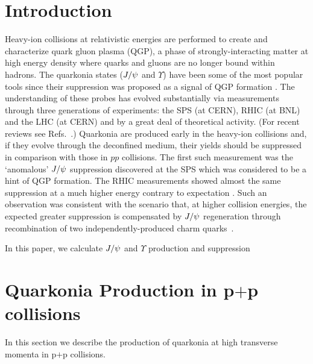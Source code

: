 \documentclass[aps,prc,preprint,superscriptaddress,showpacs,showkeys,amsmath]{revtex4-1}
\begin{document}
\maketitle

\section{Introduction}
Heavy-ion collisions at relativistic energies are performed to create and characterize 
quark gluon plasma (QGP), a phase of strongly-interacting matter at high energy density 
where quarks and gluons are no longer bound within hadrons.
The quarkonia states ($J/\psi$ and $\Upsilon$) have been some of the most popular tools 
since their suppression was proposed as a signal of QGP formation \cite{Matsui:1986dk}.
The understanding of these probes has evolved substantially via measurements 
through three generations of experiments: the SPS (at CERN), RHIC (at BNL) and the LHC (at CERN) 
and by a great deal of theoretical activity. (For recent reviews see 
Refs.~\cite{Schukraft:2013wba,Kluberg:2009wc,Brambilla:2010cs}.)
Quarkonia are produced early in the heavy-ion collisions and, if they evolve
through the deconfined medium, their yields should be suppressed in comparison with those in $pp$ collisions. 
The first such measurement was the `anomalous' $J/\psi$ suppression discovered at the SPS 
which was considered to be a hint of QGP formation. The RHIC measurements showed almost the 
same suppression at a much higher energy contrary to expectation \cite{Brambilla:2010cs,Adare:2011yf}. 
Such an observation was consistent with the scenario that, at higher collision energies, the 
expected greater suppression is compensated by  $J/\psi$ regeneration through recombination of two 
independently-produced charm quarks~\cite{Andronic:2003zv}. 

In this paper, we calculate $J/\psi$ and $\Upsilon$ production and
suppression 



\section{Quarkonia Production in p$+$p collisions}
\label{section:ppProduction}
In this section we describe the production of quarkonia at high transverse
momenta in p$+$p collisions. 
\end{document}
